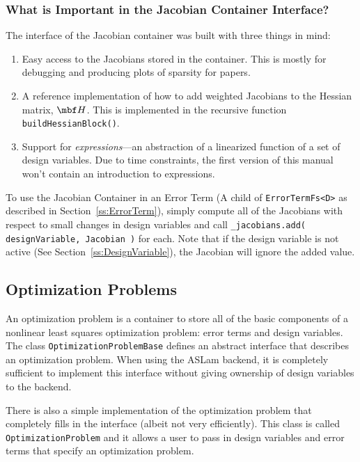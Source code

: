 \documentclass[11pt,a4,oneside]{article}
\newcommand{\txt}[1]{{\footnotesize\texttt{#1}}}
\newcommand{\listcpp}[2]{}
\begin{document}
\subsubsection{What is Important in the Jacobian Container Interface?}
The interface of the Jacobian container was built with three things in mind:
\begin{enumerate}
\item Easy access to the Jacobians stored in the container. This is mostly for debugging and producing plots of sparsity for papers.
\item A reference implementation of how to add weighted Jacobians to the Hessian matrix, $\mbf H$. This is implemented in the recursive function \txt{buildHessianBlock()}.
\item Support for {\em expressions}---an abstraction of a linearized function of a set of design variables. Due to time constraints, the first version of this manual won't contain an introduction to expressions.
\end{enumerate}
To use the Jacobian Container in an Error Term (A child of \txt{ErrorTermFs<D>} as described in Section~\ref{ss:ErrorTerm}), simply compute all of the Jacobians with respect to small changes in design variables and call \txt{\_jacobians.add( designVariable, Jacobian )} for each. Note that if the design variable is not active (See Section~\ref{ss:DesignVariable}), the Jacobian will ignore the added value.

\subsection{Optimization Problems \label{ss:OptimizationProblem}}
An optimization problem is a container to store all of the basic components of a nonlinear least squares optimization problem: error terms and design variables. The class \txt{OptimizationProblemBase} defines an abstract interface that describes an optimization problem. When using the ASLam backend, it is completely sufficient to implement this interface without giving ownership of design variables to the backend.

\listcpp{OptimizationProblemBase.hpp}{../../aslam_backend/include/aslam/backend/OptimizationProblemBase.hpp}

There is also a simple implementation of the optimization problem that completely fills in the interface (albeit not very efficiently). This class is called \txt{OptimizationProblem} and it allows a user to pass in design variables and error terms that specify an optimization problem.
\end{document}

